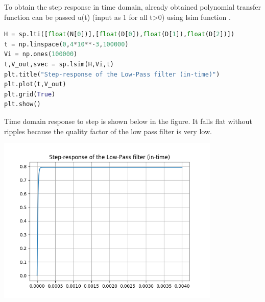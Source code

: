 \documentclass[a4paper]{article}
\begin{document}
To obtain the step response in time domain, already obtained polynomial transfer function can be passed u(t) (input as 1 for all t>0) using lsim function .
\begin{lstlisting}[language=Python]
H = sp.lti([float(N[0])],[float(D[0]),float(D[1]),float(D[2])])
t = np.linspace(0,4*10**-3,100000)
Vi = np.ones(100000)
t,V_out,svec = sp.lsim(H,Vi,t)
plt.title("Step-response of the Low-Pass filter (in-time)")
plt.plot(t,V_out) 
plt.grid(True)
plt.show()
\end{lstlisting}
Time domain response to step is shown below in the figure. It falls flat  without ripples because the quality factor of the low pass filter is very low.
\begin{center}
\includegraphics[width=0.8\textwidth]{Figure_8.png}
\end{center}
\end{document}
